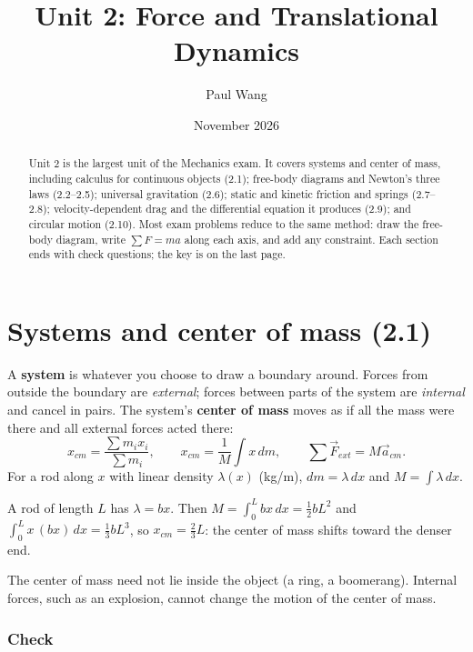 \documentclass[11pt]{article}
\title{Unit 2: Force and Translational Dynamics}
\author{Paul Wang}
\date{November 2026}
\begin{document}
\maketitle

\begin{abstract}
Unit 2 is the largest unit of the Mechanics exam. It covers systems and center of mass, including calculus for continuous objects (2.1); free-body diagrams and Newton's three laws (2.2--2.5); universal gravitation (2.6); static and kinetic friction and springs (2.7--2.8); velocity-dependent drag and the differential equation it produces (2.9); and circular motion (2.10). Most exam problems reduce to the same method: draw the free-body diagram, write $\sum F = ma$ along each axis, and add any constraint. Each section ends with check questions; the key is on the last page.
\end{abstract}


\section{Systems and center of mass (2.1)}\label{sec:1}

A \textbf{system} is whatever you choose to draw a boundary around. Forces from outside the boundary are \emph{external}; forces between parts of the system are \emph{internal} and cancel in pairs. The system's \textbf{center of mass} moves as if all the mass were there and all external forces acted there:
\[ x_{cm} = \frac{\sum m_i x_i}{\sum m_i}, \qquad x_{cm} = \frac{1}{M}\int x\,dm, \qquad \sum \vec F_{ext} = M\vec a_{cm}. \]
For a rod along $x$ with linear density $\lambda(x)$ (kg/m), $dm = \lambda\,dx$ and $M = \int \lambda\,dx$.

\begin{example}
A rod of length $L$ has $\lambda = bx$. Then $M = \int_0^L bx\,dx = \tfrac12 bL^2$ and $\int_0^L x\,(bx)\,dx = \tfrac13 bL^3$, so $x_{cm} = \tfrac23 L$: the center of mass shifts toward the denser end.
\end{example}

\begin{trap}
The center of mass need not lie inside the object (a ring, a boomerang). Internal forces, such as an explosion, cannot change the motion of the center of mass.
\end{trap}

\subsubsection{Check}\mbox{}
\end{document}

